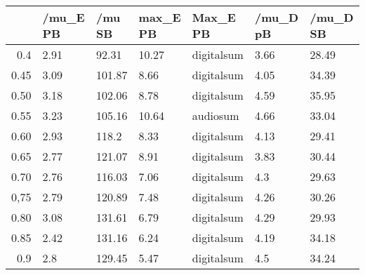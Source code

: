 \begin{table}[ht]
\centering
\begin{tabular}{rllllll}
  \hline
 & /mu\_E PB & /mu SB & max\_E PB & Max\_E PB & /mu\_D pB & /mu\_D SB \\ 
  \hline
0.4 & 2.91 & 92.31 & 10.27 & digitalsum & 3.66 & 28.49 \\ 
  0.45 & 3.09 & 101.87 & 8.66 & digitalsum & 4.05 & 34.39 \\ 
  0.50 & 3.18 & 102.06 & 8.78 & digitalsum & 4.59 & 35.95 \\ 
  0.55 & 3.23 & 105.16 & 10.64 & audiosum & 4.66 & 33.04 \\ 
  0.60 & 2.93 & 118.2 & 8.33 & digitalsum & 4.13 & 29.41 \\ 
  0.65 & 2.77 & 121.07 & 8.91 & digitalsum & 3.83 & 30.44 \\ 
  0.70 & 2.76 & 116.03 & 7.06 & digitalsum & 4.3 & 29.63 \\ 
  0,75 & 2.79 & 120.89 & 7.48 & digitalsum & 4.26 & 30.26 \\ 
  0.80 & 3.08 & 131.61 & 6.79 & digitalsum & 4.29 & 29.93 \\ 
  0.85 & 2.42 & 131.16 & 6.24 & digitalsum & 4.19 & 34.18 \\ 
  0.9 & 2.8 & 129.45 & 5.47 & digitalsum & 4.5 & 34.24 \\ 
   \hline
\end{tabular}
\end{table}
